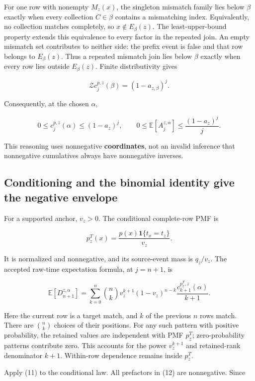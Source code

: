 \documentclass[11pt,a4paper]{article}
\newcounter{none}
\begin{document}
For one row with nonempty \(M_z(x)\), the singleton mismatch family lies below \(\beta\) exactly when every collection \(C\in\beta\) contains a mismatching index. Equivalently, no collection matches completely, so \(x\notin E_\beta(z)\). The least-upper-bound property extends this equivalence to every factor in the repeated join. An empty mismatch set contributes to neither side: the prefix event is false and that row belongs to \(E_\beta(z)\). Thus a repeated mismatch join lies below \(\beta\) exactly when every row lies outside \(E_\beta(z)\). Finite distributivity gives

\[
\mathcal Zc_j^{p,z}(\beta)=(1-a_{z,\beta})^j.
\]

Consequently, at the chosen \(\alpha\),

\[
0\le c_j^{p,z}(\alpha)\le(1-a_z)^j,
\qquad
0\le\mathbb E[A_j^{z,\alpha}]\le\frac{(1-a_z)^j}{j}. \tag{11}
\]

This reasoning uses nonnegative \textbf{coordinates}, not an invalid inference that nonnegative cumulatives always have nonnegative inverses.

\subsection{Conditioning and the binomial identity give the negative envelope}\label{conditioning-and-the-binomial-identity-give-the-negative-envelope}

For a supported anchor, \(v_z>0\). The conditional complete-row PMF is

\[
p_z^T(x)=\frac{p(x)\mathbf1\{t_x=t_z\}}{v_z}.
\]

It is normalized and nonnegative, and its source-event mass is \(q_z/v_z\). The accepted raw-time expectation formula, at \(j=n+1\), is

\[
\mathbb E[D_{n+1}^{z,\alpha}]
=\sum_{k=0}^{n}\binom nk v_z^{k+1}(1-v_z)^{n-k}
 \frac{c_{k+1}^{p_z^T,z}(\alpha)}{k+1}. \tag{12}
\]

Here the current row is a target match, and \(k\) of the previous \(n\) rows match. There are \(\binom nk\) choices of their positions. For any such pattern with positive probability, the retained values are independent with PMF \(p_z^T\); zero-probability patterns contribute zero. This accounts for the power \(v_z^{k+1}\) and retained-rank denominator \(k+1\). Within-row dependence remains inside \(p_z^T\).

Apply (11) to the conditional law. All prefactors in (12) are nonnegative. Since
\end{document}
